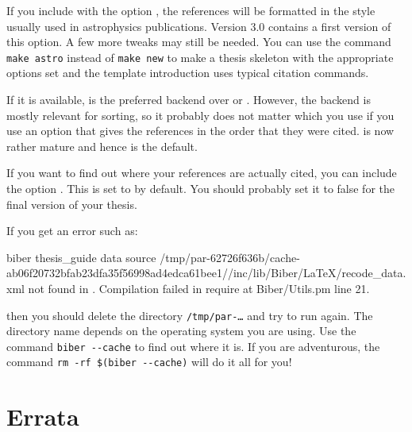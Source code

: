 If you include  with the option ,
the references will be formatted in the style usually used in astrophysics publications.
Version 3.0 contains a first version of this option.
A few more tweaks may still be needed. You can use the command
\verb|make astro| instead of \verb|make new| to make a thesis skeleton with the appropriate
options set and the template introduction uses typical citation commands.

If it is available,  is the preferred backend over
 or .
However, the backend is mostly relevant for
sorting, so it probably does not matter which you use if you use an
option that gives the references in the order that they were cited.
 is now rather mature and hence is the default.

If you want to find out where your references are actually cited, you
can include the option .
This is set to  by default.
You should probably set it to false for the final version of your thesis.

If you get an error such as:
{\scriptsize
\begin{bashlisting}
biber     thesis_guide
data source /tmp/par-62726f636b/cache-ab06f20732bfab23dfa35f56998ad4edca61bee1//inc/lib/Biber/LaTeX/recode_data.xml not found in .
Compilation failed in require at Biber/Utils.pm line 21.
\end{bashlisting}
}
\noindent
then you should delete the directory \texttt{/tmp/par-\ldots} and try to
run again. The directory name depends on the operating system you are using.
Use the command \verb|biber --cache| to find out where it is.
If you are adventurous, the command \verb|rm -rf $(biber --cache)| will do it all for you!


\section{Errata}%
\label{sec:ref:errata}

